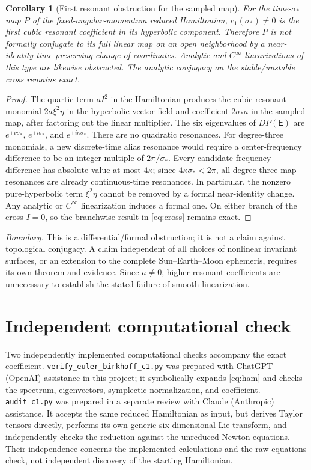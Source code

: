 \documentclass[11pt,letterpaper]{article}
\theoremstyle{paper}
\newtheorem{corollary}{Corollary}
\newcommand{\euler}{\mathsf E}
\begin{document}
\begin{corollary}[First resonant obstruction for the sampled map]
For the time-$\sigma_*$ map $P$ of the fixed-angular-momentum reduced Hamiltonian, $c_1(\sigma_*)\ne0$ is the first cubic resonant coefficient in its hyperbolic component. Therefore $P$ is not formally conjugate to its full linear map on an open neighborhood by a near-identity time-preserving change of coordinates. Analytic and $C^\infty$ linearizations of this type are likewise obstructed. The analytic conjugacy on the stable/unstable cross remains exact.
\end{corollary}
\begin{proof}
The quartic term $aI^2$ in the Hamiltonian produces the cubic resonant monomial $2a\xi^2\eta$ in the hyperbolic vector field and coefficient $2\sigma_*a$ in the sampled map, after factoring out the linear multiplier. The six eigenvalues of $DP(\euler)$ are $e^{\pm\nu\sigma_*}$, $e^{\pm i\sigma_*}$, and $e^{\pm i\kappa\sigma_*}$. There are no quadratic resonances. For degree-three monomials, a new discrete-time alias resonance would require a center-frequency difference to be an integer multiple of $2\pi/\sigma_*$. Every candidate frequency difference has absolute value at most $4\kappa$; since $4\kappa\sigma_*<2\pi$, all degree-three map resonances are already continuous-time resonances. In particular, the nonzero pure-hyperbolic term $\xi^2\eta$ cannot be removed by a formal near-identity change. Any analytic or $C^\infty$ linearization induces a formal one. On either branch of the cross $I=0$, so the branchwise result in \eqref{eq:cross} remains exact.
\end{proof}

\emph{Boundary.} This is a differential/formal obstruction; it is not a claim against topological conjugacy. A claim independent of all choices of nonlinear invariant surfaces, or an extension to the complete Sun--Earth--Moon ephemeris, requires its own theorem and evidence. Since $a\ne0$, higher resonant coefficients are unnecessary to establish the stated failure of smooth linearization.

\section{Independent computational check}

Two independently implemented computational checks accompany the exact coefficient. \texttt{verify\_euler\_}\allowbreak\texttt{birkhoff\_c1.py} was prepared with ChatGPT (OpenAI) assistance in this project; it symbolically expands \eqref{eq:ham} and checks the spectrum, eigenvectors, symplectic normalization, and coefficient. \texttt{audit\_c1.py} was prepared in a separate review with Claude (Anthropic) assistance. It accepts the same reduced Hamiltonian as input, but derives Taylor tensors directly, performs its own generic six-dimensional Lie transform, and independently checks the reduction against the unreduced Newton equations. Their independence concerns the implemented calculations and the raw-equations check, not independent discovery of the starting Hamiltonian.
\end{document}
